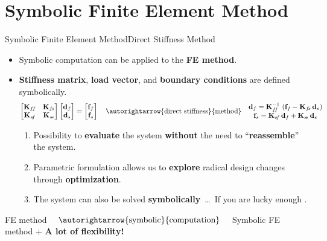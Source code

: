 \section{Symbolic Finite Element Method}

\begin{frame}{Symbolic Finite Element Method}{Direct Stiffness Method}
  \begin{itemize}
    \item Symbolic computation can be applied to the \textbf{\acs{FE} method}.
    \item \textbf{Stiffness matrix}, \textbf{load vector}, and \textbf{boundary conditions} are defined symbolically.
    \begin{equation*}
      \begin{bmatrix}
        \mathbf{K}_{f\!f} & \mathbf{K}_{f\!s} \\
        \mathbf{K}_{s\!f} & \mathbf{K}_{s\!s}
      \end{bmatrix} \begin{bmatrix}
        \mathbf{d}_{f} \\
        \mathbf{d}_{s}
      \end{bmatrix} = \begin{bmatrix}
        \mathbf{f}_{f} \\
        \mathbf{f}_{s}
      \end{bmatrix}
      \quad \autorightarrow{\text{direct stiffness}}{\text{method}} \quad
      \begin{matrix}
        \mathbf{d}_{f} = \mathbf{K}_{f\!f}^{-1}\,\left(\mathbf{f}_{f} - \mathbf{K}_{f\!s}\,\mathbf{d}_{s}\right) \\
        \mathbf{f}_{s} = \mathbf{K}_{s\!f}\,\mathbf{d}_{f} + \mathbf{K}_{s\!s}\,\mathbf{d}_{s}
      \end{matrix}
    \end{equation*}
    \begin{enumerate}
      \item Possibility to \textbf{evaluate} the system \textbf{without} the need to ``\textbf{reassemble}'' the system. \\
      \item Parametric formulation allows us to \textbf{explore} radical design changes through \textbf{optimization}. \\
      \item The system can also be solved \textbf{symbolically}~\dots~If you are lucky enough \raisebox{-3.5pt}{\huge\trollface{}}.
    \end{enumerate}
  \end{itemize}
  \begin{bbox}
    \centering
    \acs{FE} method $\quad \autorightarrow{\text{symbolic}}{\text{computation}} \quad$ Symbolic \acs{FE} method + \textcolor{fg_sl_color}{\textbf{A lot of flexibility!}}
  \end{bbox}
\end{frame}

